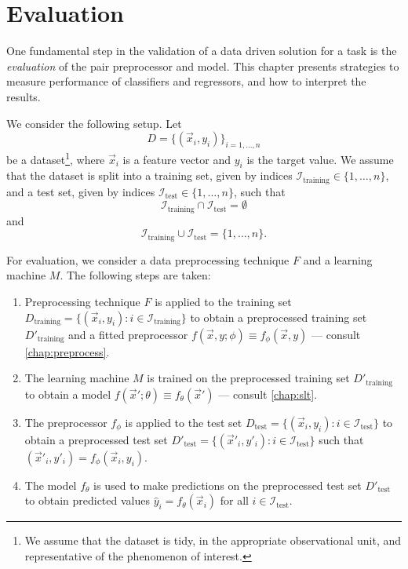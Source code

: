 \section{Evaluation}
\label{sec:evaluation}

One fundamental step in the validation of a data driven solution for a task is the
\emph{evaluation} of the pair preprocessor and model. This chapter presents strategies to
measure performance of
classifiers and regressors, and how to interpret the results.

We consider the following setup.  Let $$D = \{(\vec{x}_i, y_i)\}_{i=1,\dots,n}$$ be a
dataset\footnote{We assume that the dataset is tidy, in the appropriate observational
unit, and representative of the phenomenon of interest.}, where $\vec{x}_i$ is a feature
vector and $y_i$ is the target value.  We assume
that the dataset is split into a training set, given by indices
$\mathcal{I}_\text{training} \in \{1, \dots, n\}$, and a test set, given by indices
$\mathcal{I}_\text{test} \in \{1, \dots, n\}$, such that $$\mathcal{I}_\text{training}
\cap \mathcal{I}_\text{test} = \emptyset$$ and $$\mathcal{I}_\text{training} \cup
\mathcal{I}_\text{test} = \{1,\dots,n\}\text{.}$$

For evaluation, we consider a data preprocessing technique $F$ and a learning machine
$M$.  The following steps are taken:
\begin{enumerate}
  \item Preprocessing technique $F$ is applied to the training set $D_\text{training} =
    \{(\vec{x}_i, y_i) : i \in \mathcal{I}_\text{training}\}$ to obtain a preprocessed
    training set $D'_\text{training}$ and a fitted preprocessor $f(\vec{x}, y; \phi)
    \equiv f_\phi(\vec{x}, y)$ --- consult \cref{chap:preprocess}.
  \item The learning machine $M$ is trained on the preprocessed training set
    $D'_\text{training}$ to obtain a model $f(\vec{x}'; \theta) \equiv
    f_\theta(\vec{x}')$ --- consult \cref{chap:slt}.
  \item The preprocessor $f_\phi$ is applied to the test set $D_\text{test} =
    \{(\vec{x}_i, y_i) : i \in \mathcal{I}_\text{test}\}$ to obtain a preprocessed test
    set $D'_\text{test} = \{(\vec{x}'_i, y'_i) : i \in \mathcal{I}_\text{test}\}$ such
    that $(\vec{x}'_i, y'_i) = f_\phi(\vec{x}_i, y_i)$.
  \item The model $f_\theta$ is used to make predictions on the preprocessed test set
    $D'_\text{test}$ to obtain predicted values $\hat{y}_i = f_\theta(\vec{x}_i)$ for all
    $i \in \mathcal{I}_\text{test}$.
\end{enumerate}

